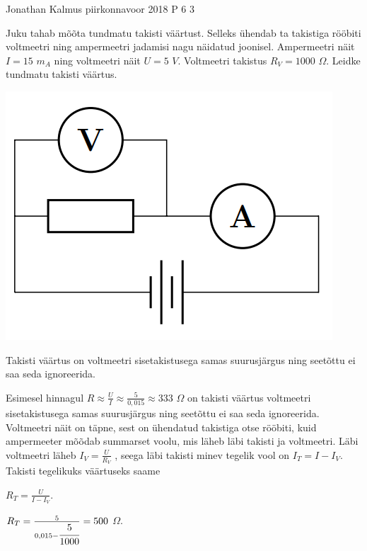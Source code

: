 {Jonathan Kalmus} %
{piirkonnavoor} %
{2018} %
{P 6} %
{3} %
{

\ifStatement
Juku tahab mõõta tundmatu takisti väärtust. Selleks ühendab ta takistiga rööbiti voltmeetri ning ampermeetri jadamisi nagu näidatud joonisel. Ampermeetri näit $I = 15$ $m_A$ ning voltmeetri näit $U = 5$  $V$. Voltmeetri takistus $R_V = 1000$ $\Omega$. Leidke tundmatu takisti väärtus.
\begin{center}
	\includegraphics[width=0.5\linewidth]{2018-v2p-06-yl.png}
\end{center}
\fi

\ifHint
Takisti väärtus on voltmeetri sisetakistusega samas suurusjärgus ning seetõttu ei saa seda ignoreerida.
\fi


\ifSolution
Esimesel hinnagul $R \approx \frac{U}{I} \approx \frac{5}{0,015} \approx 333$ $\Omega$ on takisti väärtus voltmeetri sisetakistusega samas suurusjärgus ning seetõttu ei saa seda ignoreerida. Voltmeetri näit on täpne, sest on ühendatud takistiga otse rööbiti, kuid ampermeeter mõõdab summarset voolu, mis läheb läbi takisti ja voltmeetri. Läbi voltmeetri läheb $I_V = \frac{U}{R_V}$ , seega läbi takisti minev tegelik vool on $I_T = I - I_V$. Takisti tegelikuks väärtuseks saame
\begin{center}
$R_T = \frac{U}{I - I_V}$.
\end{center}
\begin{center}
$R_T = \frac{5}{0,015 - \cfrac{5}{1000}} = 500$ $\Omega$.
\end{center}
\fi
}